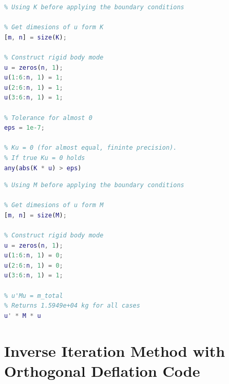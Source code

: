 \documentclass[AMdocument,optEnglish]{AMlatex}  %
\begin{document}
\begin{lstlisting}[language=Matlab]
%% Check the model: Stiffness matrix K
% Using K before applying the boundary conditions

% Get dimesions of u form K
[m, n] = size(K);

% Construct rigid body mode
u = zeros(n, 1);
u(1:6:n, 1) = 1;
u(2:6:n, 1) = 1;
u(3:6:n, 1) = 1;

% Tolerance for almost 0
eps = 1e-7;

% Ku = 0 (for almost equal, fininte precision).
% If true Ku = 0 holds
any(abs(K * u) > eps)
\end{lstlisting}

\begin{lstlisting}[language=Matlab]
%% Check the model: Total mass
% Using M before applying the boundary conditions

% Get dimesions of u form M
[m, n] = size(M);

% Construct rigid body mode
u = zeros(n, 1);
u(1:6:n, 1) = 0;
u(2:6:n, 1) = 0;
u(3:6:n, 1) = 1;

% u'Mu = m_total
% Returns 1.5949e+04 kg for all cases
u' * M * u
\end{lstlisting}

\section{Inverse Iteration Method with Orthogonal Deflation Code}
\label{sec:inverse-interation-code}
\end{document}
